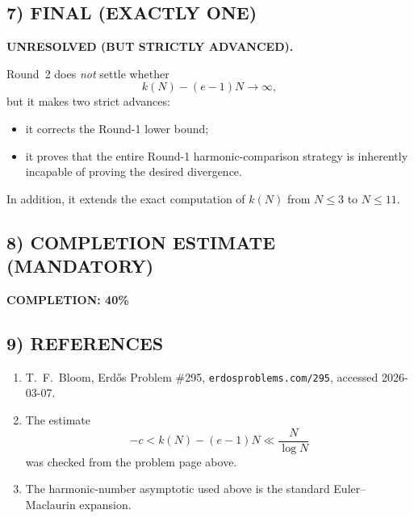 \subsection*{7) FINAL (EXACTLY ONE)}

\textbf{UNRESOLVED (BUT STRICTLY ADVANCED).}

Round~2 does \emph{not} settle whether
\[
k(N)-(e-1)N\to\infty,
\]
but it makes two strict advances:
\begin{itemize}
\item it corrects the Round-1 lower bound;
\item it proves that the entire Round-1 harmonic-comparison strategy is inherently incapable of proving the desired divergence.
\end{itemize}
In addition, it extends the exact computation of $k(N)$ from $N\le 3$ to $N\le 11$.

\subsection*{8) COMPLETION ESTIMATE (MANDATORY)}

\textbf{COMPLETION: 40\%}

\subsection*{9) REFERENCES}

\begin{enumerate}
\item T.~F.~Bloom, Erd\H{o}s Problem \#295, \texttt{erdosproblems.com/295}, accessed 2026-03-07.
\item The estimate
\[
-c<k(N)-(e-1)N\ll \frac{N}{\log N}
\]
was checked from the problem page above.
\item The harmonic-number asymptotic used above is the standard Euler--Maclaurin expansion.
\end{enumerate}

